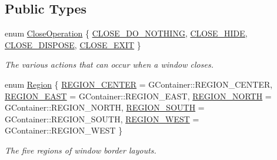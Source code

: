 \subsection*{Public Types}
\begin{DoxyCompactItemize}
\item 
enum \mbox{\hyperlink{classGWindow_a84803201f0f9569db61f51cac9e0d2d2}{Close\+Operation}} \{ \mbox{\hyperlink{classGWindow_a84803201f0f9569db61f51cac9e0d2d2aa00045aa0b706ef54f34c37f2d49f2b5}{C\+L\+O\+S\+E\+\_\+\+D\+O\+\_\+\+N\+O\+T\+H\+I\+NG}}, 
\mbox{\hyperlink{classGWindow_a84803201f0f9569db61f51cac9e0d2d2a47d285d1f0c66414bb23b7f3f3c6554b}{C\+L\+O\+S\+E\+\_\+\+H\+I\+DE}}, 
\mbox{\hyperlink{classGWindow_a84803201f0f9569db61f51cac9e0d2d2a1b8c84e0e965a877f9253f15747304f1}{C\+L\+O\+S\+E\+\_\+\+D\+I\+S\+P\+O\+SE}}, 
\mbox{\hyperlink{classGWindow_a84803201f0f9569db61f51cac9e0d2d2a74cdc7c2dc555e3334f91d8ce3e00f79}{C\+L\+O\+S\+E\+\_\+\+E\+X\+IT}}
 \}
\begin{DoxyCompactList}\small\item\em The various actions that can occur when a window closes. \end{DoxyCompactList}\item 
enum \mbox{\hyperlink{classGWindow_a81a01a86de31071a92e6cce0bab9bc4b}{Region}} \{ \mbox{\hyperlink{classGWindow_a81a01a86de31071a92e6cce0bab9bc4ba5ba85a564dbf472d69f92d5a2870db16}{R\+E\+G\+I\+O\+N\+\_\+\+C\+E\+N\+T\+ER}} = G\+Container\+:\+:R\+E\+G\+I\+O\+N\+\_\+\+C\+E\+N\+T\+ER, 
\mbox{\hyperlink{classGWindow_a81a01a86de31071a92e6cce0bab9bc4baac78951bd4e01d20f4825d5ae0a54357}{R\+E\+G\+I\+O\+N\+\_\+\+E\+A\+ST}} = G\+Container\+:\+:R\+E\+G\+I\+O\+N\+\_\+\+E\+A\+ST, 
\mbox{\hyperlink{classGWindow_a81a01a86de31071a92e6cce0bab9bc4baf40d135fb811ad59acb102f1fb357550}{R\+E\+G\+I\+O\+N\+\_\+\+N\+O\+R\+TH}} = G\+Container\+:\+:R\+E\+G\+I\+O\+N\+\_\+\+N\+O\+R\+TH, 
\mbox{\hyperlink{classGWindow_a81a01a86de31071a92e6cce0bab9bc4bab533512ba438173a4ceb9c501eb17628}{R\+E\+G\+I\+O\+N\+\_\+\+S\+O\+U\+TH}} = G\+Container\+:\+:R\+E\+G\+I\+O\+N\+\_\+\+S\+O\+U\+TH, 
\mbox{\hyperlink{classGWindow_a81a01a86de31071a92e6cce0bab9bc4ba5dd8c2219af001263c00de02b642786d}{R\+E\+G\+I\+O\+N\+\_\+\+W\+E\+ST}} = G\+Container\+:\+:R\+E\+G\+I\+O\+N\+\_\+\+W\+E\+ST
 \}
\begin{DoxyCompactList}\small\item\em The five regions of window border layouts. \end{DoxyCompactList}\end{DoxyCompactItemize}
